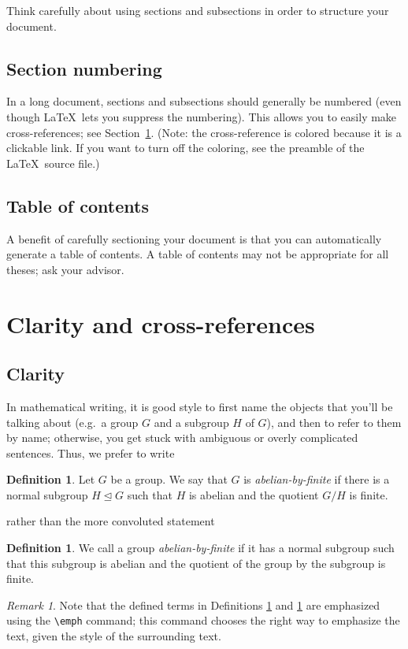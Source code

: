\documentclass[11pt]{amsart}
\theoremstyle{definition}                  %
\newtheorem{defn}[thm]{Definition}
\theoremstyle{remark}                       %
\newtheorem{rem}[thm]{Remark}
\numberwithin{equation}{section}
\begin{document}
Think carefully about using sections and subsections in order to structure your document. 

\subsection{Section numbering}

In a long document, sections and subsections should generally be numbered (even though \LaTeX\ lets you suppress the numbering). 
This allows you to easily make cross-references; see Section~\ref{items}. %
(Note: the cross-reference is colored because it is a clickable link. If you want to turn off the coloring, see the preamble of the \LaTeX\ source file.)

\subsection{Table of contents}
A benefit of carefully sectioning your document is that you can automatically generate a table of contents. A table of contents may not be appropriate for all theses; ask your advisor. 

\section{Clarity and cross-references} \label{items}

\subsection{Clarity}
In mathematical writing, it is good style to first name the objects that you'll be talking about (e.g.\ a group $G$ and a subgroup $H$ of $G$), and then to refer to them by name;  otherwise, you get stuck with ambiguous or overly complicated sentences. Thus, we prefer to write 
\begin{defn} \label{def:af1}
Let $G$ be a group. We say that $G$ is \emph{abelian-by-finite} if there is a normal subgroup $H\trianglelefteq G$ such that $H$ is abelian and the quotient $G/H$ is finite.
\end{defn}
\noindent rather than the more convoluted statement
\begin{defn}\label{def:af2}
We call a group  \emph{abelian-by-finite} if it has a normal subgroup such that this subgroup is abelian and the quotient of the group by the subgroup is finite. 
\end{defn}
\begin{rem}
Note that the defined terms in Definitions \ref{def:af1} and \ref{def:af2} are emphasized using the \verb+\emph+ command; this command chooses the right way to emphasize the text, given the style of the surrounding text.
\end{rem}
\end{document}
